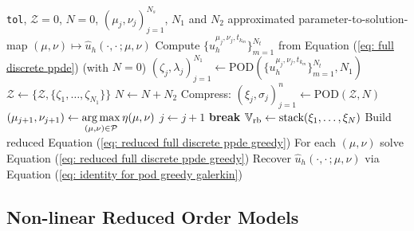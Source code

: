 \begin{algorithm}
    \caption{POD-Greedy-Galerkin} \label{algo: pod-greedy-galerkin}
    \begin{algorithmic}[1]
        \Require \texttt{tol}, $\mathcal{Z} = 0$, $N = 0$, $(\mu_j, \nu_j)_{j=1}^{N_s}$, $N_1$ and $N_2$
        \Ensure approximated parameter-to-solution-map $(\mu, \nu) \mapsto 
        \hat{u}_h(\cdot, \cdot \, ; \mu, \nu)$
            \State Compute $\{u_h^{\mu_j, \nu_j, t_{k_m}}\}_{m=1}^{N_t}$ from 
            Equation (\ref{eq: full discrete ppde}) (with $N = 0$)
            \State $(\zeta_j, \lambda_j)_{j=1}^{N_1} \gets 
            \text{POD}(\{u_h^{\mu_j,\nu_j,t_{k_m}}\}_{m=1}^{N_t}, N_1)$
            \State $\mathcal{Z} \gets \{\mathcal{Z}, \{\zeta_1, \dots, \zeta_{N_1}\}\}$
            \State $N \gets N + N_2$ 
            \State Compress: $(\xi_j, \sigma_j)_{j=1}^n \gets \text{POD}(\mathcal{Z}, N)$
            \State $(\mu_{j+1}, \nu_{j+1}) \gets \underset{(\mu, \nu) \in \mathcal{P}}{\operatorname{arg\,max}} \, \eta(\mu, \nu)$
                \State $j \gets j + 1$
            \Else
                \State \textbf{break}
            \EndIf
        \EndFor
        \State $\mathbb{V}_\text{rb} \gets \text{stack}(\xi_1, \dots, \xi_N)$
        \State Build reduced Equation (\ref{eq: reduced full discrete ppde greedy}) 
        \State For each $(\mu, \nu)$ solve Equation (\ref{eq: reduced full discrete ppde greedy})
        \State Recover $\hat{u}_h(\cdot, \cdot \, ; \mu, \nu)$ via Equation (\ref{eq: identity for pod greedy galerkin})
    \end{algorithmic}
\end{algorithm}





\subsection{Non-linear Reduced Order Models}





